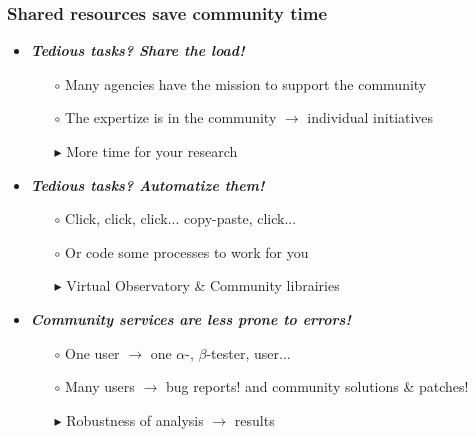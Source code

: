 \begin{frame}
  \frametitle{Shared resources save community time}

  \begin{itemize}[<.->]
    \item \emph{\bf Tedious tasks? Share the load!}
      \begin{itemize}[<.->]
        \item[$\circ$] Many agencies have the mission to support the community
        \item[] 
        \item[$\circ$] The expertize is in the community $\rightarrow$ individual initiatives
        \item[] 
        \item[$\blacktriangleright$] More time for your research
      \end{itemize}
  
    \vspace{0.5em}
  \item \emph{\bf Tedious tasks? Automatize them!}
      \begin{itemize}[<.->]
        \item[$\circ$] Click, click, click... copy-paste, click...
        \item[$\circ$] Or code some processes to work for you
        \item[$\blacktriangleright$] Virtual Observatory \& Community librairies
      \end{itemize}
  
    \vspace{0.5em}
    \item \emph{\bf Community services are less prone to errors!}
      \begin{itemize}[<.->]
        \item[$\circ$] One user $\rightarrow$ one $\alpha$-, $\beta$-tester, user...
        \item[$\circ$] Many users $\rightarrow$ bug reports! and community solutions \& patches!
        \item[$\blacktriangleright$] Robustness of analysis $\rightarrow$ results
      \end{itemize}

  \end{itemize}
  
\end{frame}




